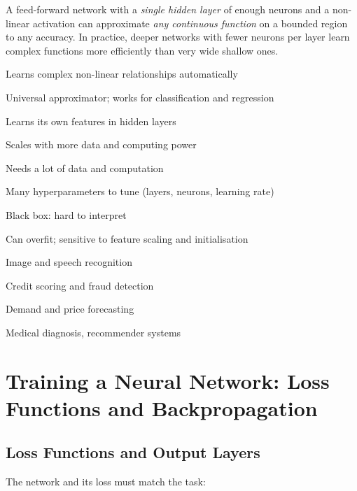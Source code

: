 \begin{definition}
A feed-forward network with a \emph{single hidden layer} of enough neurons and a non-linear activation can approximate \emph{any continuous function} on a bounded region to any accuracy. In practice, deeper networks with fewer neurons per layer learn complex functions more efficiently than very wide shallow ones.
\end{definition}

{\item Learns complex non-linear relationships automatically
 \item Universal approximator; works for classification and regression
 \item Learns its own features in hidden layers
 \item Scales with more data and computing power}
{\item Needs a lot of data and computation
 \item Many hyperparameters to tune (layers, neurons, learning rate)
 \item Black box: hard to interpret
 \item Can overfit; sensitive to feature scaling and initialisation}
{\item Image and speech recognition
 \item Credit scoring and fraud detection
 \item Demand and price forecasting
 \item Medical diagnosis, recommender systems}

\section{Training a Neural Network: Loss Functions and Backpropagation}

\subsection{Loss Functions and Output Layers}

The network and its loss must match the task:

